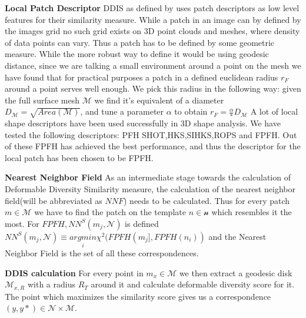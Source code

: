 \documentclass[10pt,twocolumn,letterpaper]{article}
\begin{document}
\textbf{Local Patch Descriptor}
DDIS as defined by \cite{talmi2017template} uses patch descriptors as low level features for their similarity measure. While a patch in an image can by defined by the images grid no such grid exists on 3D point clouds and meshes, where density of data points can vary. Thus a patch has to be defined by some geometric measure. While the more robust way to define it would be using geodesic distance, since we are talking a small environment around a point on the mesh we have found that for practical purposes a patch in a defined euclidean radius $r_F$ around a point serves well enough. We pick this radius in the following way: given the full surface mesh $\mathcal{M}$ we find it's equivalent of a diameter $D_\mathcal{M} = \sqrt{Area(\mathcal{M})}$, and tune a parameter $\alpha$ to obtain $r_{F} = \frac{\alpha}*D_\mathcal{M}$
A lot of local shape descriptors have been used successfully in 3D shape analysis. We have tested the following descriptors: PFH\cite{rusu2008learning} SHOT\cite{tombari2010unique},HKS\cite{Sun:2009:CPI:1735603.1735621},SIHKS\cite{bronstein2010scale},ROPS\cite{guo2013rotational} and FPFH\cite{rusu2009fast}. Out of these FPFH has achieved the best performance, and thus the descriptor for the local patch has been chosen to be FPFH. 

\textbf{Nearest Neighbor Field}
As an intermediate stage towards the calculation of Deformable Diversity Similarity measure, the calculation of the nearest neighbor field(will be abbreviated as $NNF$) needs to be calculated. Thus for every patch $m\in \mathcal{M}$ we have to find the patch on the template $n\in\mathcal{n}$ which resembles it the most. For $FPFH, NN^S(m_j,\mathcal{N})$ is defined $NN^S (m_j,\mathcal{N}) \equiv \underset{i}{argmin}\chi^2(FPFH(m_j],FPFH(n_i))$ and the Nearest Neighbor Field is the set of all these correspondences.

\textbf{DDIS calculation}
For every point in $m_x\in\mathcal{M}$ we then extract a geodesic disk $\mathcal{M}_{x,R}$ with a radius $R_T$ around it and calculate deformable diversity score for it. The point which maximizes the similarity score gives us a correspondence $(y,y*)\in \mathcal{N}\times\mathcal{M}$.
\end{document}
